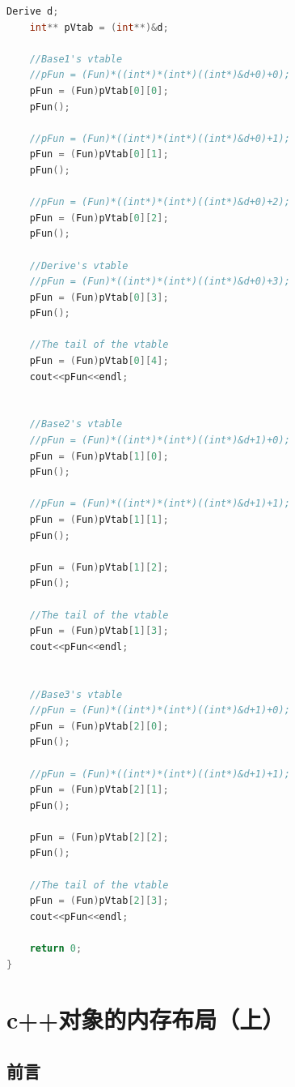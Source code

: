 \documentclass{article}
\begin{document}
\begin{CJK}{UTF8}{gbsn}
\begin{description}
\begin{lstlisting}[language=c++]
    Derive d;
    int** pVtab = (int**)&d;
 
    //Base1's vtable
    //pFun = (Fun)*((int*)*(int*)((int*)&d+0)+0);
    pFun = (Fun)pVtab[0][0];
    pFun();
 
    //pFun = (Fun)*((int*)*(int*)((int*)&d+0)+1);
    pFun = (Fun)pVtab[0][1];
    pFun();
 
    //pFun = (Fun)*((int*)*(int*)((int*)&d+0)+2);
    pFun = (Fun)pVtab[0][2];
    pFun();
 
    //Derive's vtable
    //pFun = (Fun)*((int*)*(int*)((int*)&d+0)+3);
    pFun = (Fun)pVtab[0][3];
    pFun();
 
    //The tail of the vtable
    pFun = (Fun)pVtab[0][4];
    cout<<pFun<<endl;
 
 
    //Base2's vtable
    //pFun = (Fun)*((int*)*(int*)((int*)&d+1)+0);
    pFun = (Fun)pVtab[1][0];
    pFun();
 
    //pFun = (Fun)*((int*)*(int*)((int*)&d+1)+1);
    pFun = (Fun)pVtab[1][1];
    pFun();
 
    pFun = (Fun)pVtab[1][2];
    pFun();
 
    //The tail of the vtable
    pFun = (Fun)pVtab[1][3];
    cout<<pFun<<endl;
 
 
    //Base3's vtable
    //pFun = (Fun)*((int*)*(int*)((int*)&d+1)+0);
    pFun = (Fun)pVtab[2][0];
    pFun();
 
    //pFun = (Fun)*((int*)*(int*)((int*)&d+1)+1);
    pFun = (Fun)pVtab[2][1];
    pFun();
 
    pFun = (Fun)pVtab[2][2];
    pFun();
 
    //The tail of the vtable
    pFun = (Fun)pVtab[2][3];
    cout<<pFun<<endl;
 
    return 0;
}
\end{lstlisting}
\end{description} 


\newpage
\section{c++对象的内存布局（上）}

\subsection{前言}


\end{CJK}
\end{document}
